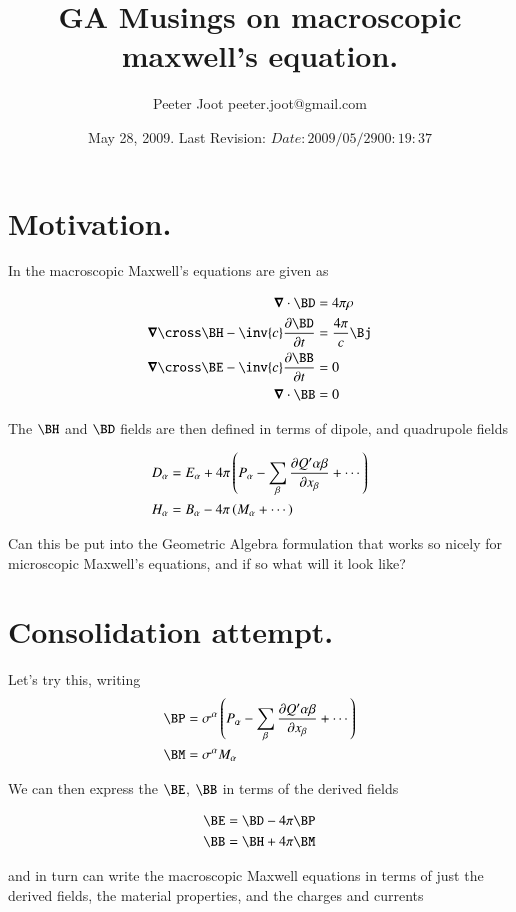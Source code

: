 \documentclass{article}
\title{ GA Musings on macroscopic maxwell's equation. }
\author{Peeter Joot \quad peeter.joot@gmail.com }
\date{ May 28, 2009.  Last Revision: $Date: 2009/05/29 00:19:37 $ }
\begin{document}
\maketitle{}
\tableofcontents
\section{ Motivation. }

In \cite{jackson1975cew} the macroscopic Maxwell's equations are given as

\begin{align}
\spacegrad \cdot \BD &= 4 \pi \rho \\
\spacegrad \cross \BH - \inv{c} \PD{t}{\BD} &= \frac{4 \pi}{c} \Bj \\
\spacegrad \cross \BE - \inv{c} \PD{t}{\BB} &= 0 \\
\spacegrad \cdot \BB &= 0
\end{align}

The $\BH$ and $\BD$ fields are then defined in terms of dipole, and quadrupole
fields

\begin{align}\label{eqn:dipoleCoordinates}
D_\alpha &= E_\alpha + 4\pi \left( P_\alpha - \sum_\beta \PD{x_\beta}{Q'\alpha\beta} + \cdots\right) \\
H_\alpha &= B_\alpha - 4\pi \left( M_\alpha + \cdots\right)
\end{align}

Can this be put into the Geometric Algebra formulation that works so
nicely for microscopic Maxwell's equations, and if so what will it look like?

\section{ Consolidation attempt. }

Let's try this, writing
\begin{align}
\BP &= \sigma^\alpha \left( P_\alpha - \sum_\beta \PD{x_\beta}{Q'\alpha\beta} + \cdots\right) \\
\BM &= \sigma^\alpha M_\alpha
\end{align}

We can then express the $\BE$, $\BB$ in terms of the derived fields

\begin{align}
\BE &= \BD - 4\pi \BP \\
\BB &= \BH + 4\pi \BM
\end{align}

and in turn can write the macroscopic Maxwell equations
in terms of just the derived fields, the material properties, and the charges and currents



\end{document}
